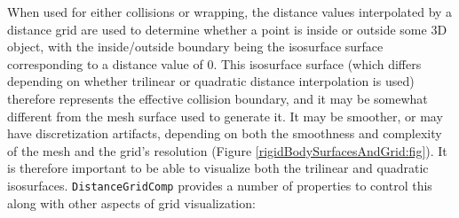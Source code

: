When used for either collisions or wrapping, the distance values
interpolated by a distance grid are used to determine whether a point
is inside or outside some 3D object, with the inside/outside boundary
being the isosurface surface corresponding to a distance
value of 0.  This isosurface surface (which differs depending on
whether trilinear or quadratic distance interpolation is used)
therefore represents the effective collision boundary, and it may be
somewhat different from the mesh surface used to generate it. It may
be smoother, or may have discretization artifacts, depending on both
the smoothness and complexity of the mesh and the grid's resolution
(Figure \ref{rigidBodySurfacesAndGrid:fig}).  It is therefore
important to be able to visualize both the trilinear and quadratic
isosurfaces.  {\tt DistanceGridComp} provides a number of properties
to control this along with other aspects of grid visualization:

